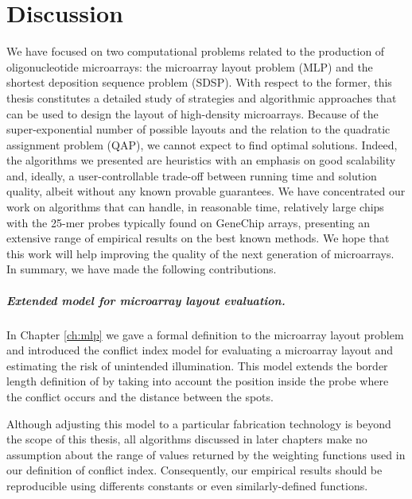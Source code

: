 \chapter{Discussion}
\label{ch:discuss}

We have focused on two computational problems related to the production of
oligonucleotide microarrays: the microarray layout problem (MLP) and the
shortest deposition sequence problem (SDSP). With respect to the former, this
thesis constitutes a detailed study of strategies and algorithmic approaches
that can be used to design the layout of high-density microarrays. Because of
the super-exponential number of possible layouts and the relation to the
quadratic assignment problem (QAP), we cannot expect to find optimal solutions.
Indeed, the algorithms we presented are heuristics with an emphasis on good
scalability and, ideally, a user-controllable trade-off between running time and
solution quality, albeit without any known provable guarantees. We have
concentrated our work on algorithms that can handle, in reasonable time,
relatively large chips with the 25-mer probes typically found on GeneChip
arrays, presenting an extensive range of empirical results on the best known
methods. We hope that this work will help improving the quality of the next
generation of microarrays. In summary, we have made the following contributions.

\paragraph{Extended model for microarray layout evaluation.} In Chapter
\ref{ch:mlp} we gave a formal definition to the microarray layout problem and
introduced the conflict index model for evaluating a microarray layout and
estimating the risk of unintended illumination. This model extends the border
length definition of \citet{Hannenhalli2002} by taking into account the position
inside the probe where the conflict occurs and the distance between the spots.

Although adjusting this model to a particular fabrication technology is beyond
the scope of this thesis, all algorithms discussed in later chapters make no
assumption about the range of values returned by the weighting functions used in
our definition of conflict index. Consequently, our empirical results should be
reproducible using differents constants or even similarly-defined functions.

